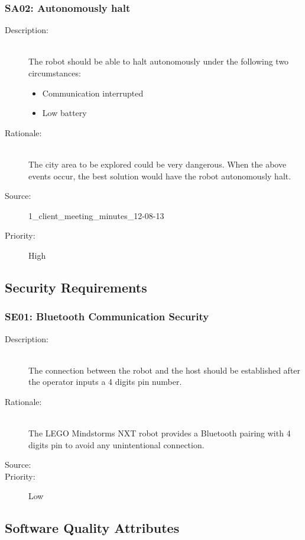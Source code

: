 \documentclass[titlepage]{article}
\begin{document}
\subsubsection{SA02: Autonomously halt}
\begin{description}
\item[Description: ] \hfill \\The robot should be able to halt autonomously under the following two circumstances: \hfill 
\begin{itemize}
\item Communication interrupted
\item Low battery
\end{itemize}
\item[Rationale: ] \hfill \\The city area to be explored could be very dangerous. When the above events occur, the best solution would have the robot autonomously halt.
\item[Source: ] 1\_client\_meeting\_minutes\_12-08-13
\item[Priority: ] High
\end{description}


\subsection{Security Requirements}
\subsubsection{SE01: Bluetooth Communication Security}
\begin{description}
\item[Description: ] \hfill \\ The connection between the robot and the host should be established after the operator inputs a 4 digits pin number.
\item[Rationale: ] \hfill \\ The LEGO Mindstorms NXT robot provides a Bluetooth pairing with 4 digits pin to avoid any unintentional connection.
\item[Source: ]  
\item[Priority: ] Low
\end{description}


\subsection{Software Quality Attributes}
\end{document}
